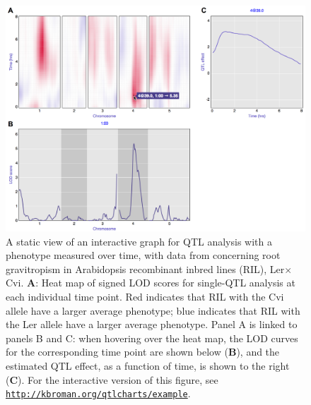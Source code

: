 \documentclass[12pt,letterpaper]{article}
\begin{document}
\newpage

\begin{figure}[!ht]
\begin{center}
\includegraphics[width=\textwidth]{Figs/fig1.png}
\vspace{1cm}
\caption{
A static view of an interactive graph for QTL analysis
with a phenotype measured over time, with data from \citet{Moore2013}
concerning root gravitropism in Arabidopsis recombinant inbred lines
(RIL), Ler$\times$Cvi.  \textbf{A}: Heat map of signed LOD
scores for single-QTL analysis at each individual time point. Red
indicates that RIL with the Cvi allele have a larger average
phenotype; blue indicates that RIL with the Ler allele have a larger
average phenotype. Panel A is linked to panels B and C: when hovering
over the heat map, the LOD curves for the corresponding time point are
shown below (\textbf{B}), and the estimated QTL effect, as a function
of time, is shown to the right (\textbf{C}).  For the interactive
version of this figure, see
\href{http://kbroman.org/qtlcharts/example}{\tt \small http://kbroman.org/qtlcharts/example}.
\label{fig:chart}
}
\end{center}
\end{figure}


\newpage
\end{document}
